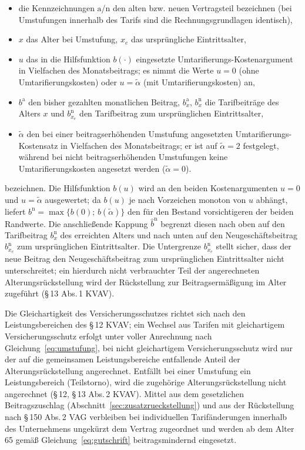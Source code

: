 \begin{itemize}\itemsep1pt
  \item die Kennzeichnungen $\mathrm{a}$/$\mathrm{n}$ den alten bzw. neuen Vertragsteil
        bezeichnen (bei Umstufungen innerhalb des Tarifs sind die
        Rechnungsgrundlagen identisch),
  \item $x$ das Alter bei Umstufung, $x_e$ das ursprüngliche
        Eintrittsalter,
  \item $u$ das in die Hilfsfunktion $b(\cdot)$ eingesetzte
        Umtarifierungs-Kostenargument in Vielfachen des Monatsbeitrags;
        es nimmt die Werte $u = 0$ (ohne Umtarifierungskosten) oder
        $u = \tilde{\alpha}$ (mit Umtarifierungskosten) an,
  \item $b^{\mathrm{a}}$ den bisher gezahlten monatlichen Beitrag,
        $b^{\mathrm{a}}_x$, $b^{\mathrm{n}}_x$ die Tarifbeiträge des Alters $x$ und
        $b^{\mathrm{n}}_{x_e}$ den Tarifbeitrag zum ursprünglichen
        Eintrittsalter,
  \item $\tilde{\alpha}$ den bei einer beitragserhöhenden Umstufung
        angesetzten Umtarifierungs-Kostensatz in Vielfachen des
        Monatsbeitrags; er ist auf $\tilde{\alpha} = 2$ festgelegt,
        während bei nicht beitragserhöhenden Umstufungen keine
        Umtarifierungskosten angesetzt werden ($\tilde{\alpha} = 0$).
\end{itemize}
bezeichnen. Die Hilfsfunktion $b(u)$ wird an den beiden
Kostenargumenten $u = 0$ und $u = \tilde{\alpha}$ ausgewertet; da
$b(u)$ je nach Vorzeichen monoton von $u$ abhängt, liefert
$b^{\mathrm{n}} = \max\{b(0);\, b(\tilde{\alpha})\}$ den für den Bestand
vorsichtigeren der beiden Randwerte. Die anschließende Kappung
$\hat{b}^{\mathrm{n}}$ begrenzt diesen nach oben auf den Tarifbeitrag $b^{\mathrm{n}}_x$
des erreichten Alters und nach unten auf den Neugeschäftsbeitrag
$b^{\mathrm{n}}_{x_e}$ zum ursprünglichen Eintrittsalter. Die Untergrenze
$b^{\mathrm{n}}_{x_e}$ stellt sicher, dass der neue Beitrag den
Neugeschäftsbeitrag zum ursprünglichen Eintrittsalter nicht
unterschreitet; ein hierdurch nicht verbrauchter Teil der angerechneten
Alterungsrückstellung wird der Rückstellung zur Beitragsermäßigung im
Alter zugeführt (\S\,13 Abs.\,1 KVAV).

Die Gleichartigkeit des Versicherungsschutzes richtet sich nach den
Leistungsbereichen des \S\,12 KVAV; ein Wechsel aus Tarifen mit
gleichartigem Versicherungsschutz erfolgt unter voller Anrechnung nach
Gleichung~\eqref{eq:umstufung}, bei nicht gleichartigem
Versicherungsschutz wird nur der auf die gemeinsamen Leistungsbereiche
entfallende Anteil der Alterungsrückstellung angerechnet. Entfällt bei
einer Umstufung ein Leistungsbereich (Teilstorno), wird die zugehörige
Alterungsrückstellung nicht angerechnet (\S\,12, \S\,13 Abs.\,2 KVAV).
Mittel aus dem gesetzlichen Beitragszuschlag
(Abschnitt~\ref{sec:zusatzrueckstellung}) und aus der Rückstellung nach
\S\,150 Abs.\,2 VAG verbleiben bei individuellen Tarifänderungen
innerhalb des Unternehmens ungekürzt dem Vertrag zugeordnet und werden
ab dem Alter 65 gemäß Gleichung~\eqref{eq:gutschrift}
beitragsmindernd eingesetzt.

